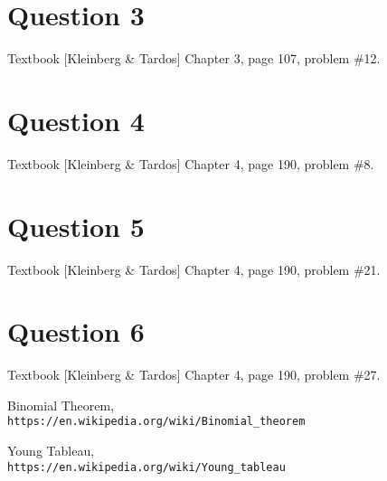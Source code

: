 \documentclass[11pt]{article}
\begin{document}
\clearpage
\section{Question 3} Textbook [Kleinberg \& Tardos] Chapter 3, page 107, problem \#12. \\


\clearpage
\section{Question 4} Textbook [Kleinberg \& Tardos] Chapter 4, page 190, problem \#8. \\
 

\clearpage
\section{Question 5} Textbook [Kleinberg \& Tardos] Chapter 4, page 190, problem \#21. \\

\clearpage
\section{Question 6} Textbook [Kleinberg \& Tardos] Chapter 4, page 190, problem \#27. \\

\clearpage

\begin{thebibliography}{9}
	Binomial Theorem,
	\\\texttt{https://en.wikipedia.org/wiki/Binomial\_theorem}
	
	Young Tableau,
	\\\texttt{https://en.wikipedia.org/wiki/Young\_tableau}
	
\end{thebibliography}
\end{document}
